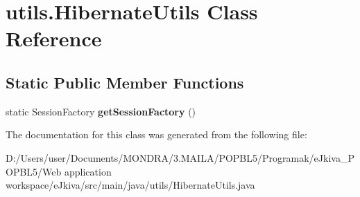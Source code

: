 \hypertarget{classutils_1_1_hibernate_utils}{}\section{utils.\+Hibernate\+Utils Class Reference}
\label{classutils_1_1_hibernate_utils}
\subsection*{Static Public Member Functions}
\begin{DoxyCompactItemize}
\item 
\mbox{\label{classutils_1_1_hibernate_utils_a48f212775a4d87ceb1116c11f05d4053}} 
static Session\+Factory {\bfseries get\+Session\+Factory} ()
\end{DoxyCompactItemize}


The documentation for this class was generated from the following file\+:\begin{DoxyCompactItemize}
\item 
D\+:/\+Users/user/\+Documents/\+M\+O\+N\+D\+R\+A/3.\+M\+A\+I\+L\+A/\+P\+O\+P\+B\+L5/\+Programak/e\+Jkiva\+\_\+\+P\+O\+P\+B\+L5/\+Web application workspace/e\+Jkiva/src/main/java/utils/Hibernate\+Utils.\+java\end{DoxyCompactItemize}
